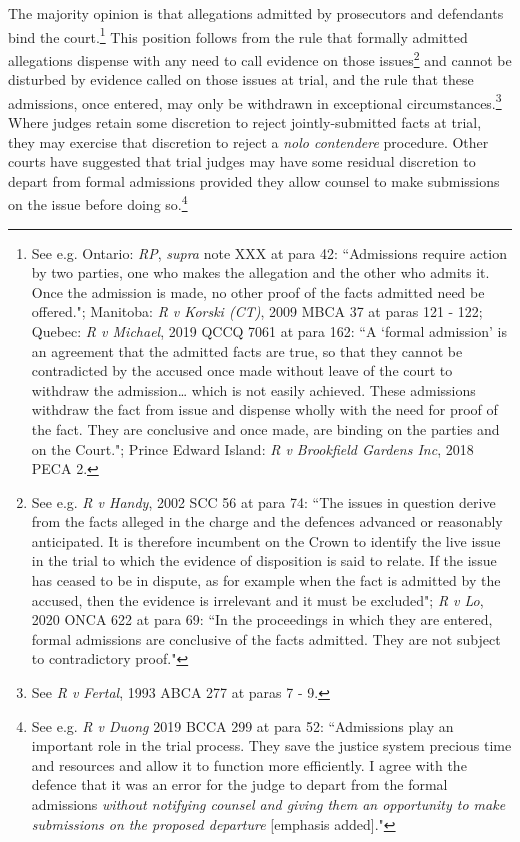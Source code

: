 The majority opinion is that allegations admitted by prosecutors and defendants bind the court.\footnote{See e.g. Ontario: \textit{RP}, \textit{supra} note XXX at para 42: ``Admissions require action by two parties, one who makes the allegation and the other who admits it. Once the admission is made, no other proof of the facts admitted need be offered."; Manitoba: \textit{R v Korski (CT)}, 2009 MBCA 37 at paras 121 - 122; Quebec: \textit{R v Michael}, 2019 QCCQ 7061 at para 162: ``A `formal admission' is an agreement that the admitted facts are true, so that they cannot be contradicted by the accused once made without leave of the court to withdraw the admission… which is not easily achieved. These admissions withdraw the fact from issue and dispense wholly with the need for proof of the fact. They are conclusive and once made, are binding on the parties and on the Court."; Prince Edward Island: \textit{R v Brookfield Gardens Inc}, 2018 PECA 2.} This position follows from the rule that formally admitted allegations dispense with any need to call evidence on those issues\footnote{See e.g. \textit{R v Handy}, 2002 SCC 56 at para 74: ``The issues in question derive from the facts alleged in the charge and the defences advanced or reasonably anticipated. It is therefore incumbent on the Crown to identify the live issue in the trial to which the evidence of disposition is said to relate. If the issue has ceased to be in dispute, as for example when the fact is admitted by the accused, then the evidence is irrelevant and it must be excluded"; \textit{R v Lo}, 2020 ONCA 622 at para 69: ``In the proceedings in which they are entered, formal admissions are conclusive of the facts admitted. They are not subject to contradictory proof."} and cannot be disturbed by evidence called on those issues at trial, and the rule that these admissions, once entered, may only be withdrawn in exceptional circumstances.\footnote{See \textit{R v Fertal}, 1993 ABCA 277 at paras 7 - 9.} Where judges retain some discretion to reject jointly-submitted facts at trial, they may exercise that discretion to reject a \textit{nolo contendere} procedure. Other courts have suggested that trial judges may have some residual discretion to depart from formal admissions provided they allow counsel to make submissions on the issue before doing so.\footnote{See e.g. \textit{R v Duong} 2019 BCCA 299 at para 52: ``Admissions play an important role in the trial process. They save the justice system precious time and resources and allow it to function more efficiently. I agree with the defence that it was an error for the judge to depart from the formal admissions \textit{without notifying counsel and giving them an opportunity to make submissions on the proposed departure} [emphasis added]."}

